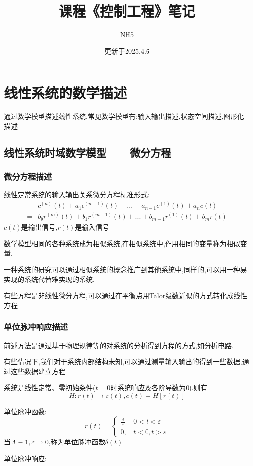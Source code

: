 \documentclass[12pt,a4paper,oneside]{ctexart}
\title{课程《控制工程》笔记}
\author{NH5}
\date{更新于2025.4.6}
\begin{document}
\maketitle
\section{线性系统的数学描述}
通过数学模型描述线性系统.常见数学模型有:输入输出描述,状态空间描述,图形化描述

\subsection{线性系统时域数学模型——微分方程}
\subsubsection{微分方程描述}
线性定常系统的输入输出关系微分方程标准形式:
\begin{align*}
    &c^{(n)}(t) + a_1c^{(n-1)}(t) + ... + a_{n-1}c^{(1)}(t) + a_nc(t)\\
    = &b_0r^{(m)}(t) + b_1r^{(m-1)}(t) + ... + b_{m-1}r^{(1)}(t) + b_mr(t)
\end{align*}
$c(t)$是输出信号,$r(t)$是输入信号

数学模型相同的各种系统成为相似系统,在相似系统中,作用相同的变量称为相似变量.

一种系统的研究可以通过相似系统的概念推广到其他系统中,同样的,可以用一种易实现的系统代替难实现的系统.

有些方程是非线性微分方程,可以通过在平衡点用Talor级数近似的方式转化成线性方程

\subsubsection{单位脉冲响应描述}
前述方法是通过基于物理规律等的对系统的分析得到方程的方式,如分析电路.

有些情况下,我们对于系统内部结构未知,可以通过测量输入输出的得到一些数据,通过这些数据建立方程

系统是线性定常、零初始条件($t=0$时系统响应及各阶导数为$0$).则有
\[
    H:r(t) \to c(t),c(t) = H[r(t)]
\]

单位脉冲函数:
\[
    r(t)=\begin{cases}
        \frac{A}{\varepsilon}, &0<t<\varepsilon \\
        0, & t<0,t>\varepsilon
    \end{cases}
\]
当$A=1,\varepsilon \to 0$,称为单位脉冲函数$\delta(t)$

单位脉冲响应:
\end{document}
